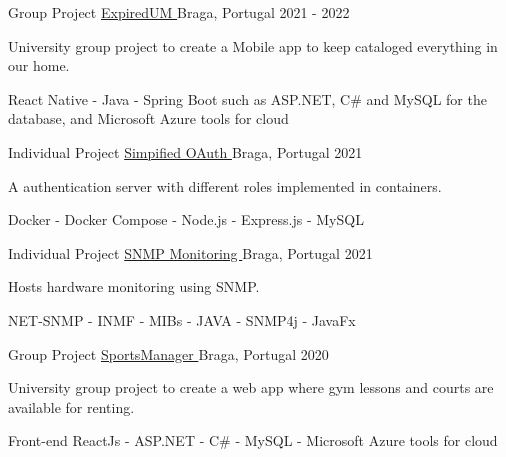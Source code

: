 

\begin{cventries}
\cventry
{Group Project} %
{\href{https://github.com/joel98ferreira/pi-project-mobile-app}{ExpiredUM \faLink}} %
{Braga, Portugal} %
{2021 - 2022} %
{
  \begin{cvitems} %
    \item {University group project to create a Mobile app to keep cataloged everything in our home.}
    \item {React Native - Java - Spring Boot such as ASP.NET, C\# and MySQL for the database, and {Microsoft Azure tools} for cloud}
  \end{cvitems}
}
\cventry
{Individual Project} %
{\href{https://github.com/filipeguimaraes/VR_TP2}{Simpified OAuth \faLink}} %
{Braga, Portugal} %
{2021} %
{
  \begin{cvitems} %
    \item {A authentication server with different roles implemented in containers.}
    \item {Docker - Docker Compose - Node.js - Express.js - MySQL} 
  \end{cvitems}
}
\cventry
{Individual Project} %
{\href{https://github.com/filipeguimaraes/GR_TP2}{SNMP Monitoring \faLink}} %
{Braga, Portugal} %
{2021} %
{
  \begin{cvitems} %
    \item {Hosts hardware monitoring using SNMP.}
    \item {NET-SNMP - INMF - MIBs - JAVA - SNMP4j - JavaFx} 
  \end{cvitems}
}
    \cventry
      {Group Project} %
      {\href{https://github.com/filipeguimaraes/LI4_1920}{SportsManager \faLink}} %
      {Braga, Portugal} %
      {2020} %
      {
        \begin{cvitems} %
          \item {University group project to create a web app where gym lessons and courts are available for renting.}
          \item {Front-end ReactJs - ASP.NET - C\# - MySQL - Microsoft Azure tools for cloud}
        \end{cvitems}
      }
 
\end{cventries}
